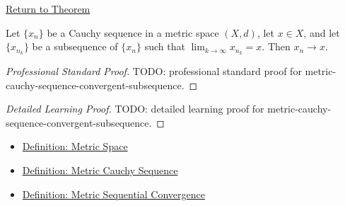 \newpage
{}
\label{prf:metric-cauchy-sequence-convergent-subsequence}

\begin{remark*}[Return]
\hyperref[thm:metric-cauchy-sequence-convergent-subsequence]{Return to Theorem}
\end{remark*}

\begin{theorem*}
Let \(\{x_n\}\) be a Cauchy sequence in a metric space \((X,d)\), let
\(x\in X\), and let \(\{x_{n_k}\}\) be a subsequence of \(\{x_n\}\) such that
\(\lim_{k\to\infty}x_{n_k}=x\).  Then \(x_n\to x\).
\end{theorem*}

\begin{proof}[Professional Standard Proof]
\LRAProofBodyStart
TODO: professional standard proof for metric-cauchy-sequence-convergent-subsequence.
\end{proof}

\begin{proof}[Detailed Learning Proof]
\LRAProofBodyStart
TODO: detailed learning proof for metric-cauchy-sequence-convergent-subsequence.
\end{proof}

\begin{remark*}
\end{remark*}

\begin{dependencies}
\begin{itemize}
  \item \hyperref[def:metric-space]{Definition: Metric Space}
  \item \hyperref[def:metric-cauchy-sequence]{Definition: Metric Cauchy Sequence}
  \item \hyperref[def:metric-sequential-convergence]{Definition: Metric Sequential Convergence}
\end{itemize}
\end{dependencies}

\clearpage
